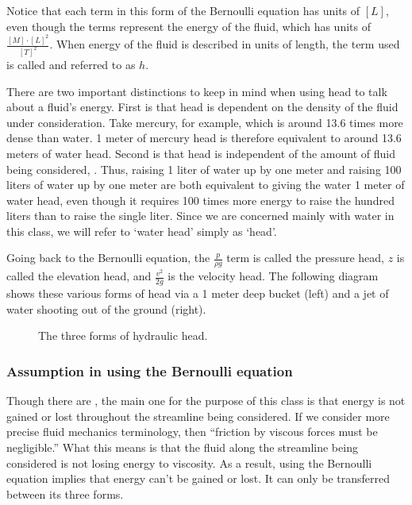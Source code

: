 \documentclass[letterpaper,10pt,english]{sphinxmanual}
\let\sphinxpxdimen\pdfpxdimen\else\newdimen\sphinxpxdimen
\begin{document}
Notice that each term in this form of the Bernoulli equation has units of \([L]\), even though the terms represent the energy of the fluid, which has units of \(\frac{[M] \cdot [L]^2}{[T]^2}\). When energy of the fluid is described in units of length, the term used is called  and referred to as \(h\).

There are two important distinctions to keep in mind when using head to talk about a fluid’s energy. First is that head is dependent on the density of the fluid under consideration. Take mercury, for example, which is around 13.6 times more dense than water. 1 meter of mercury head is therefore equivalent to around 13.6 meters of water head. Second is that head is independent of the amount of fluid being considered, . Thus, raising 1 liter of water up by one meter and raising 100 liters of water up by one meter are both equivalent to giving the water 1 meter of water head, even though it requires 100 times more energy to raise the hundred liters than to raise the single liter. Since we are concerned mainly with water in this class, we will refer to ‘water head’ simply as ‘head’.

Going back to the Bernoulli equation, the \(\frac{p}{\rho g}\) term is called the pressure head, \(z\) is called the elevation head, and \(\frac{v^2}{2g}\) is the velocity head. The following diagram shows these various forms of head via a 1 meter deep bucket (left) and a jet of water shooting out of the ground (right).

\begin{figure}[htbp]
\centering
\capstart

\noindent\sphinxincludegraphics[width=650\sphinxpxdimen]{{different_forms_of_head}.png}
\caption{The three forms of hydraulic head.}\label{\detokenize{Fluids_Review/Fluids_Review_Design:id15}}\label{\detokenize{Fluids_Review/Fluids_Review_Design:different-forms-of-head}}\end{figure}


\subsubsection{Assumption in using the Bernoulli equation}
\label{\detokenize{Fluids_Review/Fluids_Review_Design:assumption-in-using-the-bernoulli-equation}}
Though there are , the main one for the purpose of this class is that energy is not gained or lost throughout the streamline being considered. If we consider more precise fluid mechanics terminology, then “friction by viscous forces must be negligible.” What this means is that the fluid along the streamline being considered is not losing energy to viscosity. As a result, using the Bernoulli equation implies that energy can’t be gained or lost. It can only be transferred between its three forms.
\end{document}
